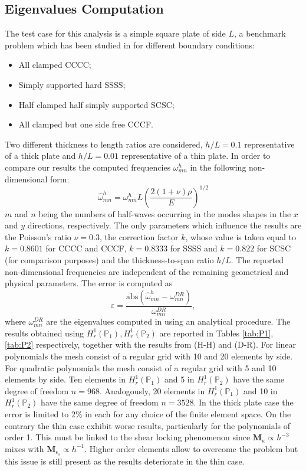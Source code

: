 \documentclass{ifacconf}
\begin{document}
\subsection{Eigenvalues Computation}
The test case for this analysis is a simple square plate of side $L$, a benchmark problem which has been studied in \cite{dawe1980rayleigh, huang1984nine, duran1999approximation} for different boundary conditions: 
\begin{itemize}
	\item All clamped CCCC; 
	\item Simply supported hard SSSS;
	\item Half clamped half simply supported SCSC;
	\item All clamped but one side free CCCF. 
\end{itemize}
Two different thickness to length ratios are considered, $h/L=0.1$ representative of a thick plate and $h/L=0.01$ representative of a thin plate. 
In order to compare our results the computed frequencies $\omega_{mn}^h$ in the following non-dimensional form:
\begin{equation}
	\widehat{\omega}_{mn}^h = \omega_{mn}^h L \left(\frac{2 (1 + \nu) \rho}{E}\right)^{1/2}
\end{equation}
$m$ and $n$ being the numbers of half-waves occurring in the modes shapes in the $x$ and $y$ directions, respectively. The only parameters which influence the results are the Poisson's ratio $\nu=0.3$, the correction factor $k$, whose value is taken equal to $k = 0.8601$ for CCCC and CCCF, $k = 0.8333$ for SSSS and $k = 0.822$ for SCSC (for comparison purposes) and the thickness-to-span ratio $h/L$. The reported non-dimensional frequencies are independent of the remaining geometrical and physical parameters.  The error is computed as
\begin{equation}
	\varepsilon = \frac{\text{abs}(\widehat{\omega}_{mn}^h - \omega_{mn}^{DR})}{\omega_{mn}^{DR}},
\end{equation}
where $\omega_{mn}^{DR}$ are the eigenvalues computed in \cite{dawe1980rayleigh} using an analytical procedure. The results obtained using $H_r^1(\mathbb{P}_1), H_r^1(\mathbb{P}_2)$ are reported in Tables \ref{tab:P1}, \ref{tab:P2} respectively, together with the results from \cite{huang1984nine} (H-H) and \citealp{dawe1980rayleigh} (D-R). For linear polynomials the mesh consist of a regular grid with 10 and 20 elements by side. For quadratic polynomials the mesh consist of a regular grid with 5 and 10 elements by side. Ten elements in $H_r^1(\mathbb{P}_1)$ and 5 in $H_r^1(\mathbb{P}_2)$ have the same degree of freedom $n=968$. Analogously, 20 elements in $H_r^1(\mathbb{P}_1)$ and 10 in $H_r^1(\mathbb{P}_2)$ have the same degree of freedom $n=3528$.  In the thick plate case the error is limited to $2\%$ in each for any choice of the finite element space. On the contrary the thin case exhibit worse results, particularly for the polynomials of order 1. This must be linked to the shear locking phenomenon since $\bm{M}_{\kappa} \propto h^{-3}$ mixes with $\bm{M}_{\epsilon_s} \propto h^{-1}$. Higher order elements allow to overcome the problem but this issue is still present as the results deteriorate in the thin case.
 
\end{document}
